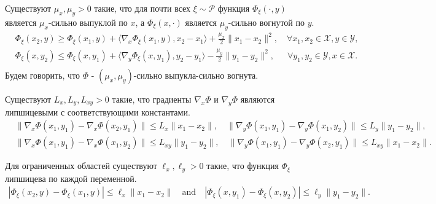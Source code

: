 \begin{assumption} \label{assump:SC-SC}
Существуют $\mu_x, \mu_y > 0$ такие, что для почти всех $\xi \sim \mathcal{P}$ функция $\Phi_{\xi}(\cdot,y)$ является $\mu_x$-сильно выпуклой по $x$, а $\Phi_{\xi}(x,\cdot)$ является $\mu_y$-сильно вогнутой по $y$.
\begin{equation*}
\begin{aligned}
    &\Phi_{\xi}(x_2,y)\geq \Phi_{\xi}(x_1,y)+\langle \nabla_x\Phi_{\xi}(x_1,y),x_2-x_1 \rangle +\frac{\mu_x}{2}\|x_1-x_2\|^2, \quad \forall x_1,x_2 \in \mathcal{X}, y\in \mathcal{Y},\\
    &\Phi_{\xi}(x,y_2)\leq \Phi_{\xi}(x,y_1)+\langle \nabla_y\Phi_{\xi}(x,y_1),y_2-y_1 \rangle -\frac{\mu_y}{2}\|y_1-y_2\|^2,\,\,\, \quad \forall y_1,y_2 \in \mathcal{Y}, x\in \mathcal{X}.\\
\end{aligned}
\end{equation*}
Будем говорить, что $\Phi$  -  $(\mu_x, \mu_y)$-сильно выпукла-сильно вогнута.
\end{assumption}

\begin{assumption}[Гладкость]\label{assump: saddle smoothness}
Существуют $L_x, L_y, L_{xy} > 0$ такие, что градиенты $\nabla_x \Phi$ и $\nabla_y \Phi$ являются липшицевыми с соответствующими константами.
\begin{equation*}
\begin{aligned}
    &\|\nabla_x \Phi(x_1,y_1)-\nabla_x\Phi(x_2,y_1)\|\leq L_x\|x_1-x_2\|, \quad
    \|\nabla_y \Phi(x_1,y_1)-\nabla_y\Phi(x_1,y_2)\|\leq L_y\|y_1-y_2\|,\\
    &\|\nabla_x \Phi(x_1,y_1)-\nabla_x\Phi(x_1,y_2)\|\leq L_{xy}\|y_1-y_2\|, \quad
    \|\nabla_y \Phi(x_1,y_1)-\nabla_y\Phi(x_2,y_1)\|\leq L_{xy}\|x_1-x_2\|.
\end{aligned}
\end{equation*}
\end{assumption}

\begin{assumption} \label{assump: saddle function Lipschitz}
Для ограниченных областей существуют $\ell_x, \ell_y > 0$ такие, что функция $\Phi_{\xi}$ липшицева по каждой переменной.
\begin{equation*}
\begin{aligned}
    |\Phi_{\xi}(x_2,y)-\Phi_{\xi}(x_1,y)| \leq \ell_x\|x_1-x_2\|\quad\mbox{and}\quad 
    |\Phi_{\xi}(x,y_1)-\Phi_{\xi}(x,y_2)| \leq \ell_y\|y_1-y_2\|.
\end{aligned}
\end{equation*}
\end{assumption}

